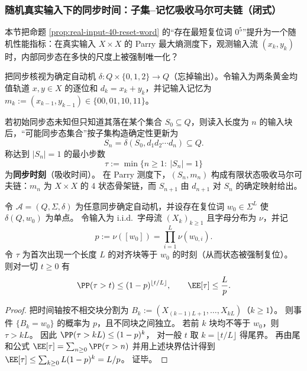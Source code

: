 \subsubsection{随机真实输入下的同步时间：子集--记忆吸收马尔可夫链（闭式）}\label{app:real-input-40-sync-time}
本节把命题 \ref{prop:real-input-40-reset-word} 的“存在最短复位词 $0^5$”提升为一个随机性能指标：在真实输入 $X\times X$ 的 Parry 最大熵测度下，观测输入流 $(x_k,y_k)$ 时，内部同步态在多快的尺度上被强制唯一化？

\begin{definition}[子集--记忆吸收链与同步时刻]\label{def:real-input-40-sync-time-absorbing}
把同步核视为确定自动机 \(\delta:Q\times\{0,1,2\}\to Q\)（忘掉输出）。令输入为两条黄金均值轨道 \(x,y\in X\) 的逐位和 \(d_k=x_k+y_k\)，并记输入记忆为 \(m_k:=(x_{k-1},y_{k-1})\in\{00,01,10,11\}\)。
\par
若初始同步态未知但只知道其落在某个集合 \(S_0\subseteq Q\)，则读入长度为 \(n\) 的输入块后，“可能同步态集合”按子集构造确定性更新为
\[
S_n=\delta(S_0,d_1d_2\cdots d_n)\subseteq Q.
\]
称达到 \(|S_n|=1\) 的最小步数
\[
\tau:=\min\{n\ge 1:\ |S_n|=1\}
\]
为\textbf{同步时刻}（吸收时间）。
在 Parry 测度下，\((S_n,m_n)\) 构成有限状态吸收马尔可夫链：\(m_n\) 为 \(X\times X\) 的 4 状态骨架链，而 \(S_{n+1}\) 由 \(d_{n+1}\) 对 \(S_n\) 的确定映射给出。
\end{definition}

\begin{proposition}[同步复位词诱导的几何尾界与均值上界]\label{prop:sync-reset-word-geometric-tail}
令 \(\mathcal A=(Q,\Sigma,\delta)\) 为任意同步确定自动机，并设存在复位词 \(w_0\in\Sigma^L\) 使 \(\delta(Q,w_0)\) 为单点。
令输入为 i.i.d.\ 字母流 \((X_k)_{k\ge 1}\) 且字母分布为 \(\nu\)，并记
\[
p:=\nu([w_0])=\prod_{i=1}^{L}\nu(w_{0,i}).
\]
令 \(\tau\) 为首次出现一个长度 \(L\) 的对齐块等于 \(w_0\) 的时刻（从而状态被强制复位）。
则对一切 \(t\ge 0\) 有
\[
\PP(\tau>t)\le (1-p)^{\lfloor t/L\rfloor},
\qquad
\EE[\tau]\le \frac{L}{p}.
\]
\end{proposition}

\begin{proof}
把时间轴按不相交块分割为 \(B_k:=(X_{(k-1)L+1},\dots,X_{kL})\)（\(k\ge 1\)）。
则事件 \(\{B_k=w_0\}\) 的概率为 \(p\)，且不同块之间独立。
若前 \(k\) 块均不等于 \(w_0\)，则 \(\tau>kL\)。
因此
\(
\PP(\tau>kL)\le (1-p)^k
\)，
对一般 \(t\) 取 \(k=\lfloor t/L\rfloor\) 得尾界。
再由尾和公式 \(\EE[\tau]=\sum_{n\ge 0}\PP(\tau>n)\) 并用上述块界估计得到
\(
\EE[\tau]\le \sum_{k\ge 0}L(1-p)^k=L/p
\)。
证毕。
\end{proof}

